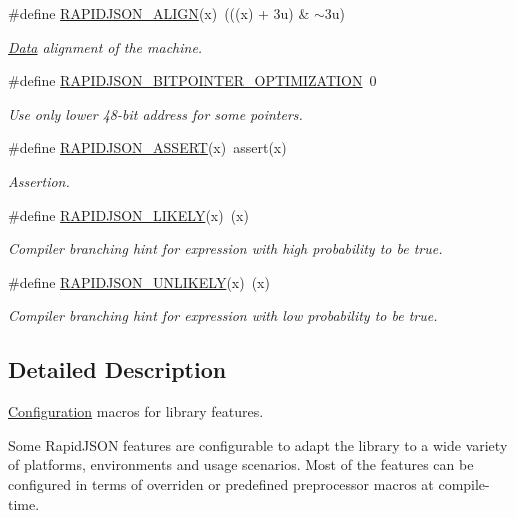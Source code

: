 \begin{DoxyCompactItemize}
\#define \hyperlink{group__RAPIDJSON__CONFIG_ga583915242504c7fdb36e826f02f76242}{R\+A\+P\+I\+D\+J\+S\+O\+N\+\_\+\+A\+L\+I\+GN}(x)~(((x) + 3u) \& $\sim$3u)
\begin{DoxyCompactList}\small\item\em \hyperlink{classData}{Data} alignment of the machine. \end{DoxyCompactList}\item 
\#define \hyperlink{group__RAPIDJSON__CONFIG_ga93fb983f78208d12c822376e1ea6d185}{R\+A\+P\+I\+D\+J\+S\+O\+N\+\_\+B\+I\+T\+P\+O\+I\+N\+T\+E\+R\+\_\+\+O\+P\+T\+I\+M\+I\+Z\+A\+T\+I\+ON}~0
\begin{DoxyCompactList}\small\item\em Use only lower 48-\/bit address for some pointers. \end{DoxyCompactList}\item 
\#define \hyperlink{group__RAPIDJSON__CONFIG_gabeba18d612187bad2ac62aed9276d47c}{R\+A\+P\+I\+D\+J\+S\+O\+N\+\_\+\+A\+S\+S\+E\+RT}(x)~assert(x)
\begin{DoxyCompactList}\small\item\em Assertion. \end{DoxyCompactList}\item 
\#define \hyperlink{group__RAPIDJSON__CONFIG_ga5dc14176a9e71ace282404b0bcda57a1}{R\+A\+P\+I\+D\+J\+S\+O\+N\+\_\+\+L\+I\+K\+E\+LY}(x)~(x)
\begin{DoxyCompactList}\small\item\em Compiler branching hint for expression with high probability to be true. \end{DoxyCompactList}\item 
\#define \hyperlink{group__RAPIDJSON__CONFIG_ga6a2b1695c13e77ae425e3cbac980ccb5}{R\+A\+P\+I\+D\+J\+S\+O\+N\+\_\+\+U\+N\+L\+I\+K\+E\+LY}(x)~(x)
\begin{DoxyCompactList}\small\item\em Compiler branching hint for expression with low probability to be true. \end{DoxyCompactList}\end{DoxyCompactItemize}


\subsection{Detailed Description}
\hyperlink{classConfiguration}{Configuration} macros for library features. 

Some Rapid\+J\+S\+ON features are configurable to adapt the library to a wide variety of platforms, environments and usage scenarios. Most of the features can be configured in terms of overriden or predefined preprocessor macros at compile-\/time.

